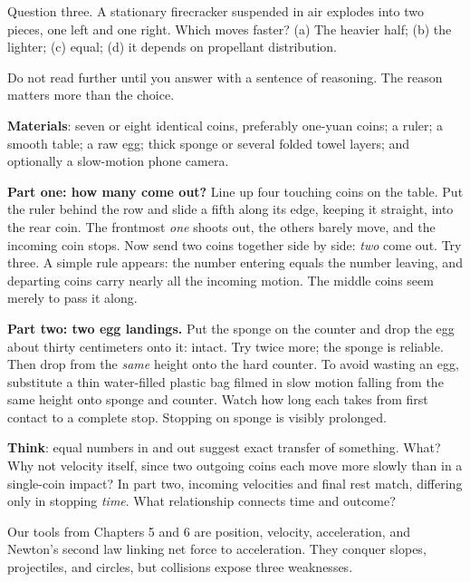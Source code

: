 Question three. A stationary firecracker suspended in air explodes into two pieces, one left and one right. Which moves faster? (a) The heavier half; (b) the lighter; (c) equal; (d) it depends on propellant distribution.

Do not read further until you answer with a sentence of reasoning. The reason matters more than the choice.


\begin{experiment}
\textbf{Materials}: seven or eight identical coins, preferably one-yuan coins; a ruler; a smooth table; a raw egg; thick sponge or several folded towel layers; and optionally a slow-motion phone camera.

\textbf{Part one: how many come out?} Line up four touching coins on the table. Put the ruler behind the row and slide a fifth along its edge, keeping it straight, into the rear coin. The frontmost \emph{one} shoots out, the others barely move, and the incoming coin stops. Now send two coins together side by side: \emph{two} come out. Try three. A simple rule appears: the number entering equals the number leaving, and departing coins carry nearly all the incoming motion. The middle coins seem merely to pass it along.

\textbf{Part two: two egg landings.} Put the sponge on the counter and drop the egg about thirty centimeters onto it: intact. Try twice more; the sponge is reliable. Then drop from the \emph{same} height onto the hard counter. To avoid wasting an egg, substitute a thin water-filled plastic bag filmed in slow motion falling from the same height onto sponge and counter. Watch how long each takes from first contact to a complete stop. Stopping on sponge is visibly prolonged.

\textbf{Think}: equal numbers in and out suggest exact transfer of something. What? Why not velocity itself, since two outgoing coins each move more slowly than in a single-coin impact? In part two, incoming velocities and final rest match, differing only in stopping \emph{time}. What relationship connects time and outcome?
\end{experiment}


Our tools from Chapters 5 and 6 are position, velocity, acceleration, and Newton's second law linking net force to acceleration. They conquer slopes, projectiles, and circles, but collisions expose three weaknesses.

